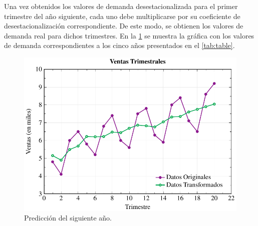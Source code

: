 Una vez obtenidos los valores de demanda desestacionalizada para el primer
trimestre del año siguiente, cada uno debe multiplicarse por su coeficiente de
desestacionalización correspondiente.
De este modo, se obtienen los valores de demanda real para dichos trimestres.
En la \cref{fig:prediction} se muestra la gráfica con los valores de demanda
correspondientes a los cinco años presentados en el \cref{tab:table}.

\begin{figure}[htpb!]
  \centering
  \includegraphics[width=\columnwidth]{../Figures/prediction-data.pdf}
  \caption{Predicción del siguiente año.}
  \label{fig:prediction}
\end{figure}


